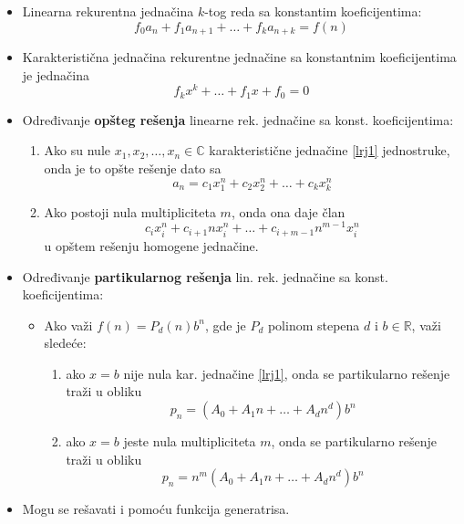 \documentclass[a4paper,12pt]{article}
\numberwithin{algorithm}{section}
\theoremstyle{plain}
\theoremstyle{definition}
\theoremstyle{remark}
\begin{document}
\begin{itemize}
    \item Linearna rekurentna jednačina $k$-tog reda sa konstantim koeficijentima:
    \[
        f_0a_n + f_1a_{n+1} + \dots + f_ka_{n + k} = f(n)
    \]    
    \item Karakteristična jednačina rekurentne jednačine sa konstantnim koeficijentima je jednačina
    \begin{equation}
        f_kx^k + \dots + f_1x + f_0 = 0
        \label{lrj1}
    \end{equation}
    \item Određivanje \textbf{opšteg rešenja} linearne rek. jednačine sa konst. koeficijentima:
    \begin{enumerate}
        \item Ako su nule $x_1, x_2, \dots, x_n \in \mathbb{C}$ karakteristične jednačine \ref{lrj1} jednostruke,
        onda je to opšte rešenje dato sa
        \[
            a_n = c_1x^n_1 + c_2x^n_2 + \dots + c_kx^n_k
        \]
        \item Ako postoji nula multipliciteta $m$, onda ona daje član 
        \[
            c_ix_i^n + c_{i+1}nx^n_i + \dots + c_{i + m - 1}n^{m - 1}x_i^n
        \]
        u opštem rešenju homogene jednačine.
    \end{enumerate}
    \item Određivanje \textbf{partikularnog rešenja} lin. rek. jednačine sa konst. koeficijentima:
    \begin{itemize}
        \item Ako važi $f(n) = P_d(n)b^n$, gde je $P_d$ polinom stepena $d$ i $b \in \mathbb{R}$, važi sledeće:
        \begin{enumerate}
            \item ako $x = b$ nije nula kar. jednačine \ref{lrj1}, onda se partikularno rešenje traži u obliku
            \[
                p_n = (A_0 + A_1n + \dots + A_dn^d)b^n            
            \]
            \item ako $x = b$ jeste nula multipliciteta $m$, onda se partikularno rešenje traži u obliku
            \[
                p_n = n^m(A_0 + A_1n+\dots + A_dn^d)b^n
            \]
        \end{enumerate}
    \end{itemize}
    \item Mogu se rešavati i pomoću funkcija generatrisa.
    
\end{itemize}
\end{document}
